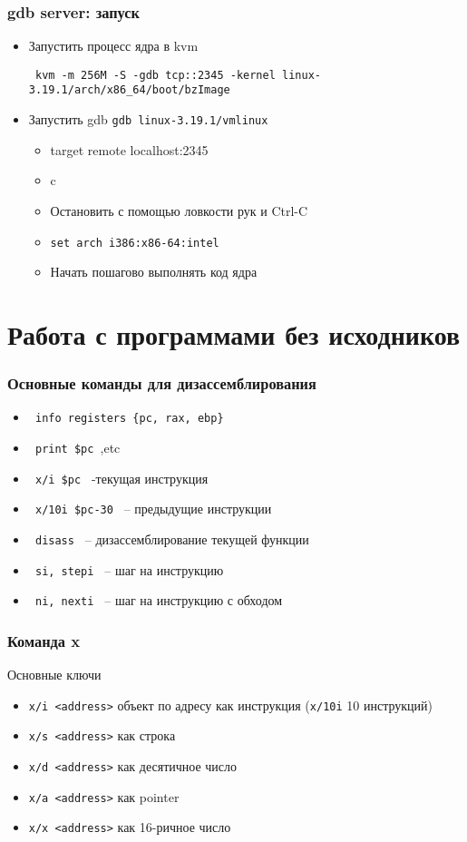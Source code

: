 \begin{frame}
  \frametitle{gdb server: запуск}
\begin{itemize}
    \item Запустить процесс ядра в kvm

      \texttt{ kvm -m 256M -S -gdb tcp::2345 -kernel linux-3.19.1/arch/x86\_64/boot/bzImage }
    \item Запустить gdb \texttt{gdb linux-3.19.1/vmlinux}
    \begin{itemize}
      \item target remote localhost:2345
      \item c
      \item Остановить с помощью ловкости рук и Ctrl-C
      \item \texttt{set arch i386:x86-64:intel}
      \item Начать пошагово выполнять код ядра
    \end{itemize}
\end{itemize}
\end{frame}
  
\section[gdb disasm]{Работа с программами без исходников}
\begin{frame}[fragile]
  \frametitle{Основные команды для дизассемблирования}
  \begin{itemize}
    \item \verb+ info registers {pc, rax, ebp} +
    \item \verb+ print $pc +,etc
    \item \verb+ x/i $pc + -текущая инструкция
    \item \verb+ x/10i $pc-30 + -- предыдущие инструкции
    \item \verb+ disass + -- дизассемблирование текущей функции
    \item \verb+ si, stepi + -- шаг на инструкцию
    \item \verb+ ni, nexti + -- шаг на инструкцию с обходом
  \end{itemize}
\end{frame}

\begin{frame}
  \frametitle{Команда x}
  Основные ключи
  \begin{itemize}
    \item \texttt{x/i <address>} объект по адресу как инструкция (\texttt{x/10i} 10 инструкций)
    \item \texttt{x/s <address>} как строка
    \item \texttt{x/d <address>} как десятичное число
    \item \texttt{x/a <address>} как pointer
    \item \texttt{x/x <address>} как 16-ричное число
  \end{itemize}
\end{frame}

